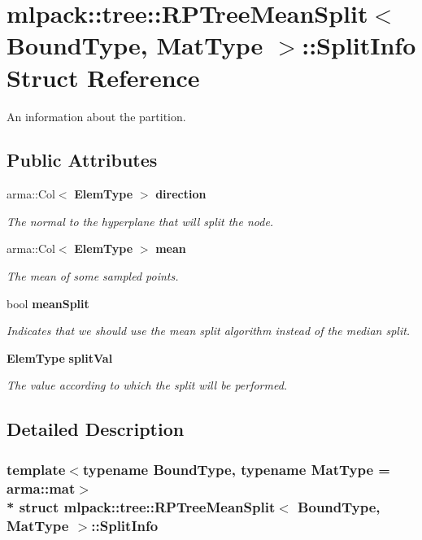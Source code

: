 \section{mlpack\+:\+:tree\+:\+:R\+P\+Tree\+Mean\+Split$<$ Bound\+Type, Mat\+Type $>$\+:\+:Split\+Info Struct Reference}
\label{structmlpack_1_1tree_1_1RPTreeMeanSplit_1_1SplitInfo}


An information about the partition.  


\subsection*{Public Attributes}
\begin{DoxyCompactItemize}
\item 
arma\+::\+Col$<$ {\bf Elem\+Type} $>$ {\bf direction}
\begin{DoxyCompactList}\small\item\em The normal to the hyperplane that will split the node. \end{DoxyCompactList}\item 
arma\+::\+Col$<$ {\bf Elem\+Type} $>$ {\bf mean}
\begin{DoxyCompactList}\small\item\em The mean of some sampled points. \end{DoxyCompactList}\item 
bool {\bf mean\+Split}
\begin{DoxyCompactList}\small\item\em Indicates that we should use the mean split algorithm instead of the median split. \end{DoxyCompactList}\item 
{\bf Elem\+Type} {\bf split\+Val}
\begin{DoxyCompactList}\small\item\em The value according to which the split will be performed. \end{DoxyCompactList}\end{DoxyCompactItemize}


\subsection{Detailed Description}
\subsubsection*{template$<$typename Bound\+Type, typename Mat\+Type = arma\+::mat$>$\\*
struct mlpack\+::tree\+::\+R\+P\+Tree\+Mean\+Split$<$ Bound\+Type, Mat\+Type $>$\+::\+Split\+Info}

